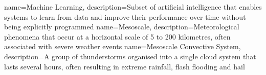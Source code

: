 {
    name=Machine Learning,
    description={Subset of artificial intelligence that enables systems to learn from data and improve their performance over time without being explicitly programmed}
}
{
    name=Mesoscale,
    description={Meteorological phenomena that occur at a horizontal scale of 5 to 200 kilometres, often associated with severe weather events}
}
{
    name=Mesoscale Convective System,
    description={A group of thunderstorms organised into a single cloud system that lasts several hours, often resulting in extreme rainfall, flash flooding and hail}
}

